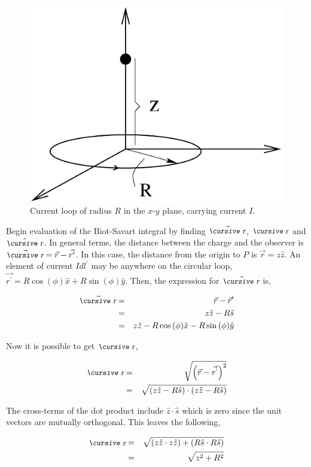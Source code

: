 \documentclass[12pt]{article}
\begin{document}
\begin{flushleft}
\begin{figure}[h]
\centering 
\includegraphics*[width=.4\columnwidth]{diskI.png} 
\caption{Current loop of radius $R$ in the $x$-$y$ plane, carrying current $I$.}
\label{fig:circloop}
\end{figure}

Begin evaluation of the Biot-Savart integral by finding $\vec{\text{\small\slshape\cursive r}}$, $\text{\small\slshape\cursive r}$ and $\hat{\text{\small\slshape\cursive r}}$.  In general terms, the distance between the charge and the observer is $\vec{\text{\small\slshape\cursive r}}=\vec{r}-\vec{r^{\prime}}$.  In this case, the distance from the origin to $P$ is $\vec{r}=z\hat{z}$.  An element of current $Idl^{\prime}$ may be anywhere on the circular loop, $\vec{r^{\prime}}=R\cos{(\phi)}\hat{x} + R\sin{(\phi)}\hat{y}$.  Then, the expression for $\vec{\text{\small\slshape\cursive r}}$ is,

\begin{eqnarray*}
\vec{\text{\small\slshape\cursive r}} & =& \vec{r}-\vec{r}^{\prime} \\
& = & z\hat{z}-R\hat{s} \\
& = & z\hat{z} - R\cos{(\phi)}\hat{x} - R\sin{(\phi)}\hat{y}
\end{eqnarray*}

Now it is possible to get $\text{\small\slshape\cursive r}$,

\begin{eqnarray*}
\text{\small\slshape\cursive r}  & =& \sqrt{ \left( \vec{r} - \vec{r^{`}} \right)^{2} } \\
 & = & \sqrt{ \left( z\hat{z} - R\hat{s} \right) \cdot  \left( z\hat{z} - R\hat{s} \right)} 
 \end{eqnarray*}
 
 The cross-terms of the dot product include $\hat{z} \cdot \hat{s}$ which is zero since the unit vectors are mutually orthogonal.  This leaves the following,

 \begin{eqnarray*}
\text{\small\slshape\cursive r} & = & \sqrt{  (z\hat{z} \cdot z\hat{z}) +  (R\hat{s} \cdot  R\hat{s})} \\
  & = & \sqrt{  z^{2} + R^{2} }
\end{eqnarray*}


\end{flushleft}
\end{document}
